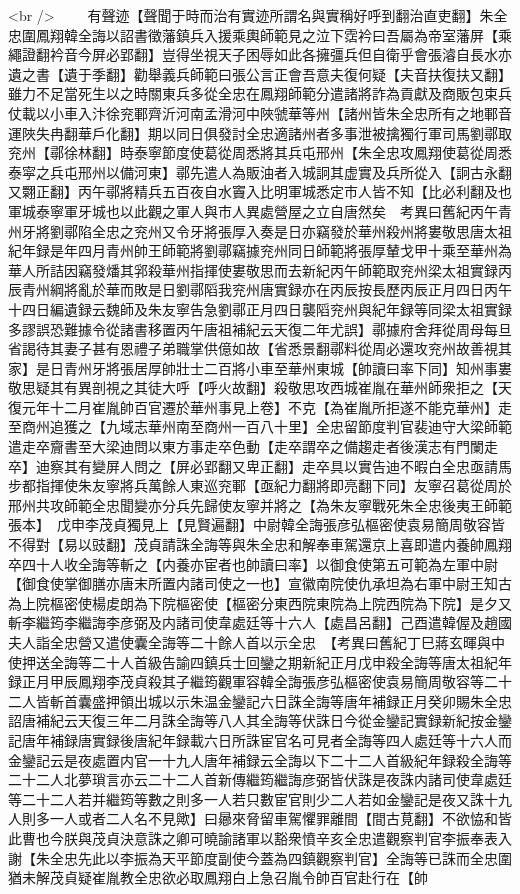 <br />
　　有聲迹【聲聞于時而治有實迹所謂名與實稱好呼到翻治直吏翻】朱全忠圍鳳翔韓全誨以詔書徵藩鎮兵入援乘輿師範見之泣下霑衿曰吾屬為帝室藩屏【乘繩證翻衿音今屏必郢翻】豈得坐視天子困辱如此各擁彊兵但自衛乎會張濬自長水亦遺之書【遺于季翻】勸舉義兵師範曰張公言正會吾意夫復何疑【夫音扶復扶又翻】雖力不足當死生以之時關東兵多從全忠在鳳翔師範分遣諸將詐為貢獻及商販包束兵仗載以小車入汴徐兖鄆齊沂河南孟滑河中陜虢華等州【諸州皆朱全忠所有之地鄆音運陜失冉翻華戶化翻】期以同日俱發討全忠適諸州者多事泄被擒獨行軍司馬劉鄩取兖州【鄩徐林翻】時泰寧節度使葛從周悉將其兵屯邢州【朱全忠攻鳳翔使葛從周悉泰寜之兵屯邢州以備河東】鄩先遣人為販油者入城詗其虚實及兵所從入【詗古永翻又翾正翻】丙午鄩將精兵五百夜自水竇入比明軍城悉定市人皆不知【比必利翻及也軍城泰寧軍牙城也以此觀之軍人與市人異處營屋之立自唐然矣　考異曰舊紀丙午青州牙將劉鄩陷全忠之兖州又令牙將張厚入奏是日亦竊發於華州殺州將婁敬思唐太祖紀年録是年四月青州帥王師範將劉鄩竊據兖州同日師範將張厚輦戈甲十乘至華州為華人所詰因竊發燔其郛殺華州指揮使婁敬思而去新紀丙午師範取兖州梁太祖實録丙辰青州綱將亂於華而敗是日劉鄩䧟我兖州唐實録亦在丙辰按長歷丙辰正月四日丙午十四日編遺録云魏師及朱友寧告急劉鄩正月四日襲䧟兖州與紀年録等同梁太祖實録多謬誤恐難據令從諸書移置丙午唐祖補紀云天復二年尤誤】鄩據府舍拜從周母每旦省謁待其妻子甚有恩禮子弟職掌供億如故【省悉景翻鄩料從周必還攻兖州故善視其家】是日青州牙將張居厚帥壯士二百將小車至華州東城【帥讀曰率下同】知州事婁敬思疑其有異剖視之其徒大呼【呼火故翻】殺敬思攻西城崔胤在華州師衆拒之【天復元年十二月崔胤帥百官遷於華州事見上卷】不克【為崔胤所拒遂不能克華州】走至商州追獲之【九域志華州南至商州一百八十里】全忠留節度判官裴迪守大梁師範遣走卒齎書至大梁迪問以東方事走卒色動【走卒謂卒之備趨走者後漢志有門闌走卒】迪察其有變屏人問之【屏必郢翻又卑正翻】走卒具以實告迪不暇白全忠亟請馬步都指揮使朱友寧將兵萬餘人東巡兖鄆【亟紀力翻將即亮翻下同】友寧召葛從周於邢州共攻師範全忠聞變亦分兵先歸使友寧并將之【為朱友寧戰死朱全忠後夷王師範張本】　戊申李茂貞獨見上【見賢遍翻】中尉韓全誨張彦弘樞密使袁易簡周敬容皆不得對【易以豉翻】茂貞請誅全誨等與朱全忠和解奉車駕還京上喜即遣内養帥鳳翔卒四十人收全誨等斬之【内養亦宦者也帥讀曰率】以御食使第五可範為左軍中尉【御食使掌御膳亦唐末所置内諸司使之一也】宣徽南院使仇承坦為右軍中尉王知古為上院樞密使楊䖍朗為下院樞密使【樞密分東西院東院為上院西院為下院】是夕又斬李繼筠李繼誨李彦弼及内諸司使韋處廷等十六人【處昌呂翻】己酉遣韓偓及趙國夫人詣全忠營又遣使囊全誨等二十餘人首以示全忠　【考異曰舊紀丁巳蔣玄暉與中使押送全誨等二十人首級告諭四鎮兵士回鑾之期新紀正月戊申殺全誨等唐太祖紀年録正月甲辰鳳翔李茂貞殺其子繼筠觀軍容韓全誨張彦弘樞密使袁易簡周敬容等二十二人皆斬首囊盛押領出城以示朱温金鑾記六日誅全誨等唐年補録正月癸卯賜朱全忠詔唐補紀云天復三年二月誅全誨等八人其全誨等伏誅日今從金鑾記實録新紀按金鑾記唐年補録唐實録後唐紀年録載六日所誅宦官名可見者全誨等四人處廷等十六人而金鑾記云是夜處置内官一十九人唐年補録云全誨以下二十二人首級紀年録殺全誨等二十二人北夢瑣言亦云二十二人首新傳繼筠繼誨彦弼皆伏誅是夜誅内諸司使韋處廷等二十二人若并繼筠等數之則多一人若只數宦官則少二人若如金鑾記是夜又誅十九人則多一人或者二人名不見歟】曰曏來脅留車駕懼罪離間【間古莧翻】不欲恊和皆此曹也今朕與茂貞決意誅之卿可曉諭諸軍以豁衆憤辛亥全忠遣觀察判官李振奉表入謝【朱全忠先此以李振為天平節度副使今蓋為四鎮觀察判官】全誨等已誅而全忠圍猶未解茂貞疑崔胤教全忠欲必取鳳翔白上急召胤令帥百官赴行在【帥